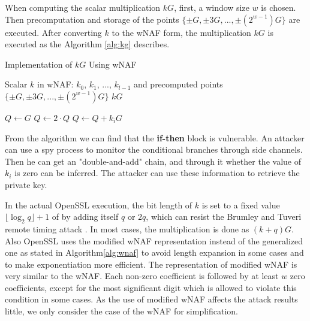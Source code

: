 When computing the scalar multiplication $kG$,
first, a window size $w$ is chosen.
Then precomputation and storage of the points $\{\pm G, \pm 3G, ..., \pm(2^{w - 1})G\}$ are executed.
After converting $k$ to the wNAF form, the multiplication $kG$ is executed as the Algorithm \ref{alg:kg} describes.


\renewcommand{\algorithmicrequire}{\textbf{Input:}}
\renewcommand{\algorithmicensure}{\textbf{Output:}}

 \begin{algorithm}[b]
        \caption{Implementation of $kG$ Using wNAF}
        \label{alg:kg}
        \begin{algorithmic}[1]
            \Require Scalar $k$ in wNAF: $k_0$, $k_1$, ..., $k_{l-1}$ and precomputed points $\{\pm G, \pm 3G, ..., \pm(2^{w - 1})G\}$
            \Ensure $kG$

            \State $Q \gets G$
                \State $Q \gets 2\cdot Q$
                    \State $Q \gets Q + k_{i}G$
                \EndIf
            \EndFor
        \end{algorithmic}
    \end{algorithm}


From the algorithm we can find that the \textbf{if-then} block is vulnerable.
An attacker can use a spy process to monitor the conditional branches through side channels.
Then he can get an "double-and-add" chain, and through it whether the value of $k_i$ is zero can be inferred.
The attacker can use these information to retrieve the private key.

In the actual OpenSSL execution, the bit length of $k$ is set to a fixed value$\lfloor\log_{2}{q}\rfloor + 1$ of by adding itself $q$
or $2q$, which can resist the Brumley and Tuveri remote timing attack \cite{Brumley2011}.
In most cases, the multiplication is done as $(k + q)G$.
Also OpenSSL uses the modified wNAF representation instead of the generalized one as stated in Algorithm\ref{alg:wnaf} to avoid length expansion in some cases and to make exponentiation more efficient.
The representation of modified wNAF is very similar to the wNAF.
Each non-zero coefficient is followed by at least $w$ zero coefficients,
 except for the most significant digit which is allowed to violate this condition in some cases.
As the use of modified wNAF affects the attack results little,
 we only consider the case of the wNAF for simplification. %


